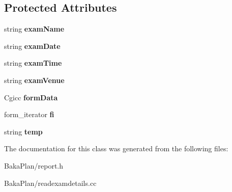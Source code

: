 \subsection*{Protected Attributes}
\begin{DoxyCompactItemize}
\item 
\hypertarget{classReadExamDetails_a815896608a58b449b451305306dd8d38}{string {\bfseries exam\-Name}}\label{classReadExamDetails_a815896608a58b449b451305306dd8d38}

\item 
\hypertarget{classReadExamDetails_a66cd09674039e76f3137d08fea2d9ef2}{string {\bfseries exam\-Date}}\label{classReadExamDetails_a66cd09674039e76f3137d08fea2d9ef2}

\item 
\hypertarget{classReadExamDetails_a86b8b41b014ce26c12113b49137520ef}{string {\bfseries exam\-Time}}\label{classReadExamDetails_a86b8b41b014ce26c12113b49137520ef}

\item 
\hypertarget{classReadExamDetails_a0ef2238b4dd4e930b278658fcf184b73}{string {\bfseries exam\-Venue}}\label{classReadExamDetails_a0ef2238b4dd4e930b278658fcf184b73}

\item 
\hypertarget{classReadExamDetails_a7dff5b6a855ccacaf477b3dd79850c91}{Cgicc {\bfseries form\-Data}}\label{classReadExamDetails_a7dff5b6a855ccacaf477b3dd79850c91}

\item 
\hypertarget{classReadExamDetails_a2d108fa7b89860260891d1fc13329153}{form\-\_\-iterator {\bfseries fi}}\label{classReadExamDetails_a2d108fa7b89860260891d1fc13329153}

\item 
\hypertarget{classReadExamDetails_a77167675e8c30ba10941b7e36866e08e}{string {\bfseries temp}}\label{classReadExamDetails_a77167675e8c30ba10941b7e36866e08e}

\end{DoxyCompactItemize}


The documentation for this class was generated from the following files\-:\begin{DoxyCompactItemize}
\item 
Baka\-Plan/report.\-h\item 
Baka\-Plan/readexamdetails.\-cc\end{DoxyCompactItemize}
